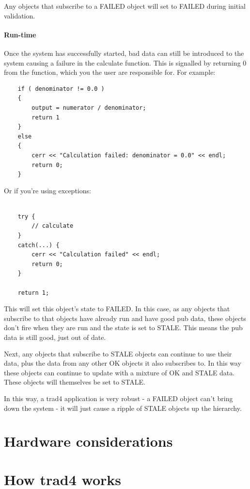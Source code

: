 \documentclass{report}
\begin{document}
Any objects that subscribe to a FAILED object will set to FAILED during initial validation. 

\subsubsection{Run-time}

Once the system has successfully started, bad data can still be introduced to the system causing a failure in the calculate function. This is signalled by returning 0 from the function, which you the user are responsible for. For example:

\begin{verbatim}
    if ( denominator != 0.0 )
    {
        output = numerator / denominator;
        return 1
    }
    else
    {
        cerr << "Calculation failed: denominator = 0.0" << endl;
        return 0;   
    }
\end{verbatim}

Or if you're using exceptions:

\begin{verbatim}

    try {
        // calculate
    }
    catch(...) {
        cerr << "Calculation failed" << endl;
        return 0;
    }
    
    return 1;
\end{verbatim}

This will set this object's state to FAILED. In this case, as any objects that subscribe to that objects have already run and have good pub data, these objects don't fire when they are run and the state is set to STALE. This means the pub data is still good, just out of date.

Next, any objects that subscribe to STALE objects can continue to use their data, plus the data from any other OK objects it also subscribes to. In this way these objects can continue to update with a mixture of OK and STALE data. These objects will themselves be set to STALE.

In this way, a trad4 application is very robust - a FAILED object can't bring down the system - it will just cause a ripple of STALE objects up the hierarchy.


\chapter{Hardware considerations}

\appendix

\chapter{How trad4 works}
\end{document}
